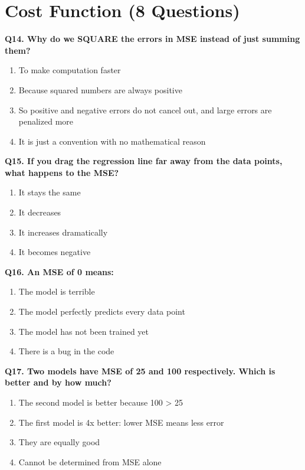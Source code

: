 \documentclass[12pt, a4paper]{article}
\newcommand{\question}[1]{\vspace{0.6em}\noindent\textbf{#1}}
\begin{document}
\section{Cost Function (8 Questions)}

\question{Q14. Why do we SQUARE the errors in MSE instead of just summing them?}
\begin{enumerate}[label=\alph*)]
    \item To make computation faster
    \item Because squared numbers are always positive
    \item So positive and negative errors do not cancel out, and large errors are penalized more
    \item It is just a convention with no mathematical reason
\end{enumerate}

\question{Q15. If you drag the regression line far away from the data points, what happens to the MSE?}
\begin{enumerate}[label=\alph*)]
    \item It stays the same
    \item It decreases
    \item It increases dramatically
    \item It becomes negative
\end{enumerate}

\question{Q16. An MSE of 0 means:}
\begin{enumerate}[label=\alph*)]
    \item The model is terrible
    \item The model perfectly predicts every data point
    \item The model has not been trained yet
    \item There is a bug in the code
\end{enumerate}

\question{Q17. Two models have MSE of 25 and 100 respectively. Which is better and by how much?}
\begin{enumerate}[label=\alph*)]
    \item The second model is better because 100 > 25
    \item The first model is 4x better: lower MSE means less error
    \item They are equally good
    \item Cannot be determined from MSE alone
\end{enumerate}
\end{document}
